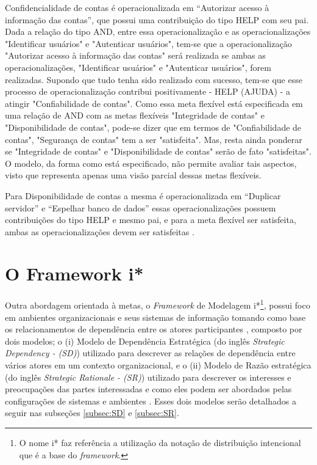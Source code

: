 Confidencialidade de contas é operacionalizada em “Autorizar acesso à informação das contas”, que possui uma contribuição do tipo HELP com seu pai. Dada a relação do tipo AND, entre essa operacionalização e as operacionalizações "Identificar usuários" e "Autenticar usuários", tem-se que a operacionalização "Autorizar acesso à informação das contas"  será realizada se ambas as operacionalizações, "Identificar usuários" e "Autenticar usuários", forem realizadas. Supondo que tudo tenha sido realizado com sucesso, tem-se que esse processo de operacionalização contribui positivamente - HELP (AJUDA) - a atingir "Confiabilidade de contas". Como essa meta flexível está especificada em uma relação de AND com as metas flexíveis "Integridade de contas" e "Disponibilidade de contas", pode-se dizer que em termos de "Confiabilidade de contas", "Segurança de contas" tem a ser "satisfeita". Mas, resta ainda ponderar se "Integridade de contas" e "Disponibilidade de contas" serão de fato "satisfeitas". O modelo, da forma como está especificado, não permite avaliar tais aspectos, visto que representa apenas uma visão parcial dessas metas flexíveis.


Para Disponibilidade de contas a mesma é operacionalizada em “Duplicar servidor” e “Espelhar banco de dados” essas operacionalizações possuem contribuições do tipo HELP e mesmo pai, e para a meta flexível ser satisfeita, ambas as operacionalizações devem ser satisfeitas \cite{affleck2012supporting}. 


\section{O Framework i*}
\label{sec:i*}


Outra abordagem orientada à metas, o \textit{Framework} de Modelagem i*\footnote[1]{O nome i* faz referência a utilização da notação de distribuição intencional que é a base do \textit{framework}.}, possui foco em ambientes organizacionais e seus sistemas de informação tomando como base os relacionamentos de dependência entre os atores participantes \cite{yu1997towards} \cite{istarwiki20}, composto por dois modelos; o (i) Modelo de Dependência Estratégica (do inglês \textit{Strategic Dependency - (SD)}) utilizado para descrever as relações de dependência entre vários atores em um contexto organizacional, e o (ii) Modelo de Razão estratégica (do inglês \textit{Strategic Rationale - (SR)}) utilizado para descrever os interesses e preocupações das partes interessadas e como eles podem ser abordados pelas configurações de sistemas e ambientes \cite{yu1997towards}. Esses dois modelos serão detalhados a seguir nas subseções \ref{subsec:SD} e \ref{subsec:SR}.

